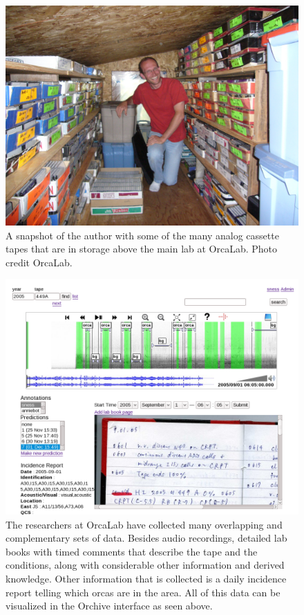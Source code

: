 \begin{figure}[t]
\centering
\includegraphics[width=\columnwidth]{figures/orcaTapes}
\caption{A snapshot of the author with some of the many analog
  cassette tapes that are in storage above the main lab at
  OrcaLab. Photo credit OrcaLab.}
\label{fig:orcaTapes}
\end{figure}


\begin{figure}[t]
\centering
\includegraphics[width=\columnwidth]{figures/orchiveFull}
\caption{The researchers at OrcaLab have collected many overlapping
  and complementary sets of data.  Besides audio recordings, detailed
  lab books with timed comments that describe the tape and the
  conditions, along with considerable other information and derived
  knowledge.  Other information that is collected is a daily incidence
  report telling which orcas are in the area.  All of this data can be
  visualized in the Orchive interface as seen above.}
\label{fig:orchiveFull}
\end{figure}

